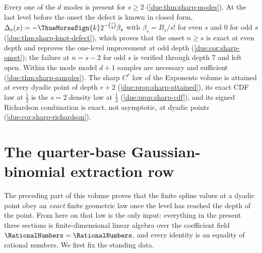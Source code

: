 \documentclass[11pt,oneside]{article}
\theoremstyle{plain}
\theoremstyle{definition}
\theoremstyle{remark}
\newcommand{\Kk}{\RationalNumbers}                          %
\begin{document}
\begin{summarybox}[title={Section summary}]
Every one of the $d$ modes is present for $s\ge2$
(\cref{due:thm:sharp-modes}).  At the last level before the onset the
defect is known in closed form,
$\Delta_{s}(x)=-\ThueMorseSign{k}2^{-\binom s2}\beta_{s}$ with
$\beta_{s}=B_{s}/s!$ for even $s$ and $0$ for odd $s$
(\cref{due:thm:sharp-knot-defect}), which proves that the onset $n\ge s$
is exact at even depth and reproves the one-level improvement at odd depth
(\cref{due:cor:sharp-onset}); the failure at $n=s-2$ for odd $s$ is
verified through depth $7$ and left open.  Within the mode model $d+1$
samples are necessary and sufficient (\cref{due:thm:sharp-samples}).  The
sharp $C^{r}$ law of the Exponents volume is attained at every dyadic point
of depth $r+2$ (\cref{due:prop:sharp-attained}), its exact CDF law at
$\tfrac12$ is the $s=2$ density law at $\tfrac14$
(\cref{due:prop:sharp-cdf}), and its signed Richardson combination is exact,
not asymptotic, at dyadic points (\cref{due:cor:sharp-richardson}).
\end{summarybox}


\section{The quarter-base Gaussian-binomial extraction row}
\label{due:sec:extraction}

The preceding part of this volume proves that the finite spline values at a
dyadic point obey an \emph{exact} finite geometric law once the level has
reached the depth of the point.  From here on that law is the only input:
everything in the present three sections is finite-dimensional linear algebra
over the coefficient field $\Kk=\RationalNumbers$, and every identity is an
equality of rational numbers.  We first fix the standing data.
\end{document}
